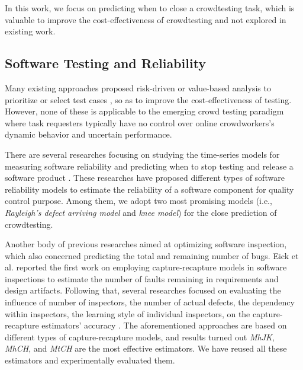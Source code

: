 \documentclass[sigconf,review, anonymous]{acmart}
\begin{document}
In this work, we focus on predicting when to close a crowdtesting task, which is valuable to improve the cost-effectiveness of crowdtesting and not explored in existing work.


\subsection{Software Testing and Reliability}
\label{subsec:related_inspection}


Many existing approaches proposed risk-driven or value-based analysis to prioritize or select test cases \cite{wang2017qtep,shi2015comparing,harman2015empirical,saha2015information,henard2016comparing,panichella2015improving}, so as to improve the cost-effectiveness of testing.
However, none of these is applicable to the emerging crowd testing paradigm where task requesters typically have no control over online crowdworkers's dynamic behavior and uncertain performance.

There are several researches focusing on studying the time-series models for measuring software reliability and predicting when to stop testing and release a software product \cite{garg2011stop,garg2013method,iqbal2013software}.
These researches have proposed different types of software reliability models to estimate the reliability of a software component for quality control purpose. 
Among them, we adopt two most promising models (i.e., \textit{Rayleigh's defect arriving model} and \textit{knee model}) for the close prediction of crowdtesting. 


Another body of previous researches aimed at optimizing software inspection, which also concerned predicting the total and remaining number of bugs.
Eick et al. \cite{eick1992estimating} reported the first work on employing capture-recapture models in software inspections to estimate the number of faults remaining in requirements and design artifacts.
Following that, several researches focused on evaluating the influence of number of inspectors, the number of actual defects, the dependency within inspectors, the learning style of individual inspectors, on the capture-recapture estimators' accuracy \cite{briand2000comprehensive,walia2009evaluating,chun2006estimating,rong2017towards,mandala2012application,goswami2015using,vitharana2017defect}.
The aforementioned approaches are based on different types of capture-recapture models, and results turned out \textit{MhJK}, \textit{MhCH}, and \textit{MtCH} are the most effective estimators.
We have reused all these estimators and experimentally evaluated them.
\end{document}
